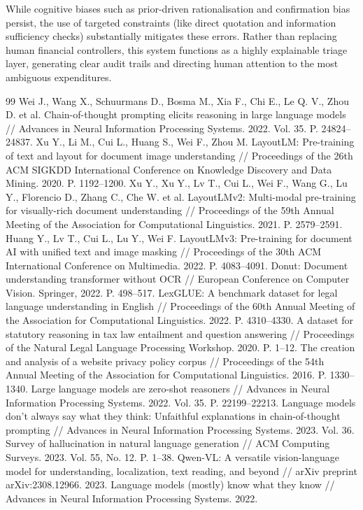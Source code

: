 \documentclass[11pt,a4paper]{article}
\begin{document}
While cognitive biases such as prior-driven rationalisation and confirmation bias persist, the use of targeted constraints (like direct quotation and information sufficiency checks) substantially mitigates these errors. Rather than replacing human financial controllers, this system functions as a highly explainable triage layer, generating clear audit trails and directing human attention to the most ambiguous expenditures.

\begin{thebibliography}{99}
 Wei J., Wang X., Schuurmans D., Bosma M., Xia F., Chi E., Le Q. V., Zhou D. et al. Chain-of-thought prompting elicits reasoning in large language models // Advances in Neural Information Processing Systems. 2022. Vol. 35. P. 24824--24837.
 Xu Y., Li M., Cui L., Huang S., Wei F., Zhou M. LayoutLM: Pre-training of text and layout for document image understanding // Proceedings of the 26th ACM SIGKDD International Conference on Knowledge Discovery and Data Mining. 2020. P. 1192--1200.
 Xu Y., Xu Y., Lv T., Cui L., Wei F., Wang G., Lu Y., Florencio D., Zhang C., Che W. et al. LayoutLMv2: Multi-modal pre-training for visually-rich document understanding // Proceedings of the 59th Annual Meeting of the Association for Computational Linguistics. 2021. P. 2579--2591.
 Huang Y., Lv T., Cui L., Lu Y., Wei F. LayoutLMv3: Pre-training for document AI with unified text and image masking // Proceedings of the 30th ACM International Conference on Multimedia. 2022. P. 4083--4091.
 Donut: Document understanding transformer without OCR // European Conference on Computer Vision. Springer, 2022. P. 498--517.
 LexGLUE: A benchmark dataset for legal language understanding in English // Proceedings of the 60th Annual Meeting of the Association for Computational Linguistics. 2022. P. 4310--4330.
 A dataset for statutory reasoning in tax law entailment and question answering // Proceedings of the Natural Legal Language Processing Workshop. 2020. P. 1--12.
 The creation and analysis of a website privacy policy corpus // Proceedings of the 54th Annual Meeting of the Association for Computational Linguistics. 2016. P. 1330--1340.
 Large language models are zero-shot reasoners // Advances in Neural Information Processing Systems. 2022. Vol. 35. P. 22199--22213.
 Language models don't always say what they think: Unfaithful explanations in chain-of-thought prompting // Advances in Neural Information Processing Systems. 2023. Vol. 36.
 Survey of hallucination in natural language generation // ACM Computing Surveys. 2023. Vol. 55, No. 12. P. 1--38.
 Qwen-VL: A versatile vision-language model for understanding, localization, text reading, and beyond // arXiv preprint arXiv:2308.12966. 2023.
 Language models (mostly) know what they know // Advances in Neural Information Processing Systems. 2022.
\end{thebibliography}
\end{document}
